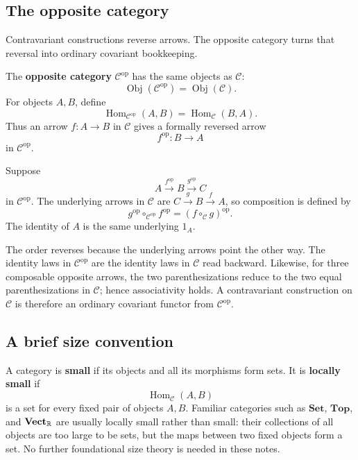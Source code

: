 \subsection{The opposite category}
Contravariant constructions reverse arrows. The opposite category turns that
reversal into ordinary covariant bookkeeping.

\begin{definition}\label{def:opposite-category}
The \textbf{opposite category} $\mathcal C^{\mathrm{op}}$ has the same
objects as $\mathcal C$:
\[
\operatorname{Obj}(\mathcal C^{\mathrm{op}})
=\operatorname{Obj}(\mathcal C).
\]
For objects $A,B$, define
\[
\operatorname{Hom}_{\mathcal C^{\mathrm{op}}}(A,B)
=\operatorname{Hom}_{\mathcal C}(B,A).
\]
Thus an arrow $f:A\to B$ in $\mathcal C$ gives a formally reversed arrow
\[
f^{\mathrm{op}}:B\longrightarrow A
\]
in $\mathcal C^{\mathrm{op}}$.

Suppose
\[
A\xrightarrow{f^{\mathrm{op}}}B
\xrightarrow{g^{\mathrm{op}}}C
\]
in $\mathcal C^{\mathrm{op}}$. The underlying arrows in $\mathcal C$ are
$C\xrightarrow{g}B\xrightarrow{f}A$, so composition is defined by
\[
\boxed{
g^{\mathrm{op}}\circ_{\mathcal C^{\mathrm{op}}}f^{\mathrm{op}}
=(f\circ_{\mathcal C}g)^{\mathrm{op}}.}
\]
The identity of $A$ is the same underlying $1_A$.
\end{definition}

The order reverses because the underlying arrows point the other way. The
identity laws in $\mathcal C^{\mathrm{op}}$ are the identity laws in
$\mathcal C$ read backward. Likewise, for three composable opposite arrows,
the two parenthesizations reduce to the two equal parenthesizations in
$\mathcal C$; hence associativity holds. A contravariant construction on
$\mathcal C$ is therefore an ordinary covariant functor from
$\mathcal C^{\mathrm{op}}$.

\subsection{A brief size convention}
A category is \textbf{small} if its objects and all its morphisms form sets.
It is \textbf{locally small} if
\[
\operatorname{Hom}_{\mathcal C}(A,B)
\]
is a set for every fixed pair of objects $A,B$. Familiar categories such as
$\mathbf{Set}$, $\mathbf{Top}$, and $\mathbf{Vect}_{\mathbb{R}}$ are usually locally
small rather than small: their collections of all objects are too large to be
sets, but the maps between two fixed objects form a set. No further
foundational size theory is needed in these notes.

